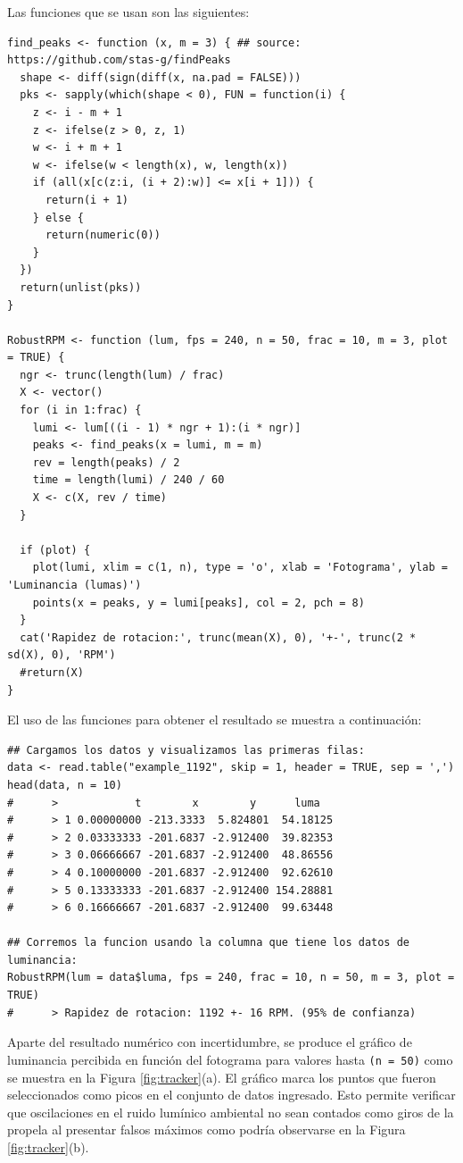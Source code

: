 Las funciones que se usan son las siguientes:
\begin{lstlisting}[belowskip=-2.6\baselineskip]
find_peaks <- function (x, m = 3) { ## source: https://github.com/stas-g/findPeaks
  shape <- diff(sign(diff(x, na.pad = FALSE)))
  pks <- sapply(which(shape < 0), FUN = function(i) {
    z <- i - m + 1
    z <- ifelse(z > 0, z, 1)
    w <- i + m + 1
    w <- ifelse(w < length(x), w, length(x))
    if (all(x[c(z:i, (i + 2):w)] <= x[i + 1])) {
      return(i + 1)
    } else {
      return(numeric(0))
    } 
  })
  return(unlist(pks))
}

RobustRPM <- function (lum, fps = 240, n = 50, frac = 10, m = 3, plot = TRUE) {
  ngr <- trunc(length(lum) / frac)
  X <- vector()
  for (i in 1:frac) {
    lumi <- lum[((i - 1) * ngr + 1):(i * ngr)]
    peaks <- find_peaks(x = lumi, m = m)
    rev = length(peaks) / 2
    time = length(lumi) / 240 / 60
    X <- c(X, rev / time)
  }
  
  if (plot) {
    plot(lumi, xlim = c(1, n), type = 'o', xlab = 'Fotograma', ylab = 'Luminancia (lumas)')
    points(x = peaks, y = lumi[peaks], col = 2, pch = 8)
  }
  cat('Rapidez de rotacion:', trunc(mean(X), 0), '+-', trunc(2 * sd(X), 0), 'RPM')
  #return(X)
}
\end{lstlisting}

El uso de las funciones para obtener el resultado se muestra a continuación:
\begin{lstlisting}[belowskip=-2.6\baselineskip]
## Cargamos los datos y visualizamos las primeras filas:
data <- read.table("example_1192", skip = 1, header = TRUE, sep = ',')
head(data, n = 10)
#      >            t        x        y      luma
#      > 1 0.00000000 -213.3333  5.824801  54.18125
#      > 2 0.03333333 -201.6837 -2.912400  39.82353
#      > 3 0.06666667 -201.6837 -2.912400  48.86556
#      > 4 0.10000000 -201.6837 -2.912400  92.62610
#      > 5 0.13333333 -201.6837 -2.912400 154.28881
#      > 6 0.16666667 -201.6837 -2.912400  99.63448

## Corremos la funcion usando la columna que tiene los datos de luminancia:
RobustRPM(lum = data$luma, fps = 240, frac = 10, n = 50, m = 3, plot = TRUE)
#      > Rapidez de rotacion: 1192 +- 16 RPM. (95% de confianza)
\end{lstlisting}

Aparte del resultado numérico con incertidumbre, se produce el gráfico de luminancia percibida en función del fotograma para valores hasta \verb|(n = 50)| como se muestra en la Figura \ref{fig:tracker}(a). El gráfico marca los puntos que fueron seleccionados como picos en el conjunto de datos ingresado. Esto permite verificar que oscilaciones en el ruido lumínico ambiental no sean contados como giros de la propela al presentar falsos máximos como podría observarse en la Figura \ref{fig:tracker}(b). 

